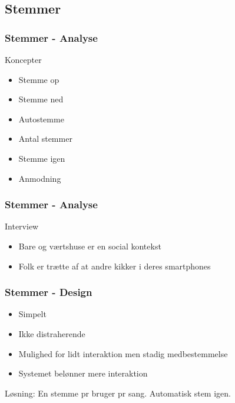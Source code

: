 \subsection{Stemmer}
\begin{frame}
	\frametitle{Stemmer - Analyse}
	Koncepter
	\begin{itemize}
		\item Stemme op
		\item Stemme ned
		\item Autostemme
		\item Antal stemmer
		\item Stemme igen
		\item Anmodning
	\end{itemize}
\end{frame}

\begin{frame}
	\frametitle{Stemmer - Analyse}
	Interview
	\begin{itemize}
		\item Bare og værtshuse er en social kontekst
		\item Folk er trætte af at andre kikker i deres smartphones
	\end{itemize}
\end{frame}

\begin{frame}
	\frametitle{Stemmer - Design}
	\begin{itemize}
		\item Simpelt
		\item Ikke distraherende
		\item Mulighed for lidt interaktion men stadig medbestemmelse
		\item Systemet belønner mere interaktion
	\end{itemize}
	Løsning: En stemme pr bruger pr sang. Automatisk stem igen.
\end{frame}